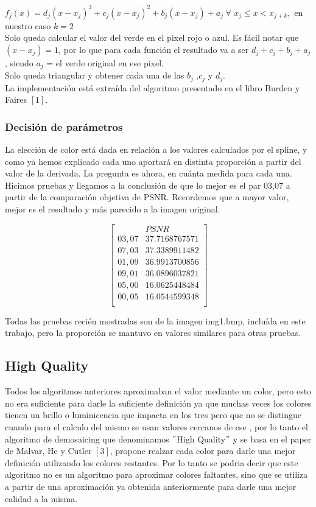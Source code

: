 $f_j(x) = d_j(x-x_j)^3 + c_j(x-x_j)^2 + b_j(x-x_j) + a_j\ \forall$ $x_j \leq x < x_{j+k}$,\ en nuestro caso $k = 2$ \\

Solo queda calcular el valor del verde en el pixel rojo o azul.
Es fácil notar que $(x-x_j) = 1$, por lo que para cada función el resultado va a ser $d_j+c_j+b_j+a_j$, siendo $a_j$ = el verde original en ese pixel.\\
Solo queda triangular y obtener cada una de las $b_j$ ,$c_j$ y $d_j$.\\
La implementación está extraída del algoritmo presentado en el libro Burden y Faires $[1]$.

\subsubsection{Decisión de parámetros}
La elección de color está dada en relación a los valores calculados por el spline, y como ya hemos explicado cada uno aportará en distinta proporción a partir del valor de la derivada. La pregunta es ahora, en cuánta medida para cada una. Hicimos pruebas y llegamos a la conclusión de que lo mejor es el par 03,07 a partir de la comparación objetiva de PSNR. Recordemos que a mayor valor, mejor es el resultado y más parecido a la imagen original.

$$ 
\begin{bmatrix}
           &          PSNR          \\
       03,07   &      37.7168767571 \\
       07,03   &      37.3389911482 \\
       01,09   &      36.9913700856 \\
       09,01   &      36.0896037821 \\
       05,00   &      16.0625448484 \\       
       00,05   &      16.0544599348 \\
\end{bmatrix} 
$$

Todas las pruebas recién mostradas son de la imagen img1.bmp, incluída en este trabajo, pero la proporción se mantuvo en valores similares para otras pruebas.

\subsection{High Quality}

Todos los algoritmos anteriores aproximaban el valor mediante un color, pero esto no era suficiente para darle la suficiente definición ya que muchas veces los colores tienen un brillo o luminicencia que impacta en los tres pero que no se distingue cuando para el calculo del mismo se usan valores cercanos de ese , por lo tanto el algoritmo de demosaicing que denominamos $"$High Quality$"
$ y se basa en el paper de Malvar, He y Cutler $[3]$, propone realzar cada color para darle una mejor definición utilizando los colores restantes. Por lo tanto se podria decir que este algoritmo no es un algoritmo para aproximar colores faltantes, sino que se utiliza a partir de una aproximación ya obtenida anteriormente para darle una mejor calidad a la misma.

